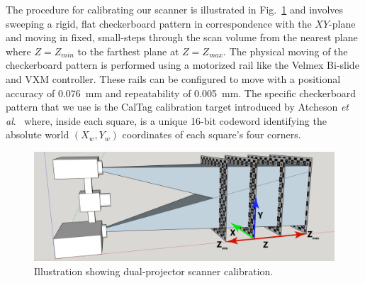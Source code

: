 \documentclass[]{spie}  %
\begin{document}
The procedure for calibrating our scanner is illustrated in Fig.~\ref{Fig:20} and involves sweeping a rigid, flat checkerboard pattern in correspondence with the $XY$-plane and moving in fixed, small-steps through the scan volume from the nearest plane where $Z = Z_{min}$ to the farthest plane at $Z = Z_{max}$.  The physical moving of the checkerboard pattern is performed using a motorized rail like the Velmex Bi-slide and VXM controller.  These rails can be configured to move with a positional accuracy of 0.076~mm and repeatability of 0.005~mm.  The specific checkerboard pattern that we use is the CalTag calibration target introduced by Atcheson \textit{et al}.~\cite{atch10} where, inside each square, is a unique 16-bit codeword identifying the absolute world $(X_w,Y_w)$ coordinates of each square's four corners.

\begin{figure}[!t]
\centerline{\includegraphics[width=6.6in]{Figures/SLICalibrationDual}}
\vspace{0.1in}
\caption{Illustration showing dual-projector scanner calibration.}
\label{Fig:20}
\end{figure} 
\end{document}
